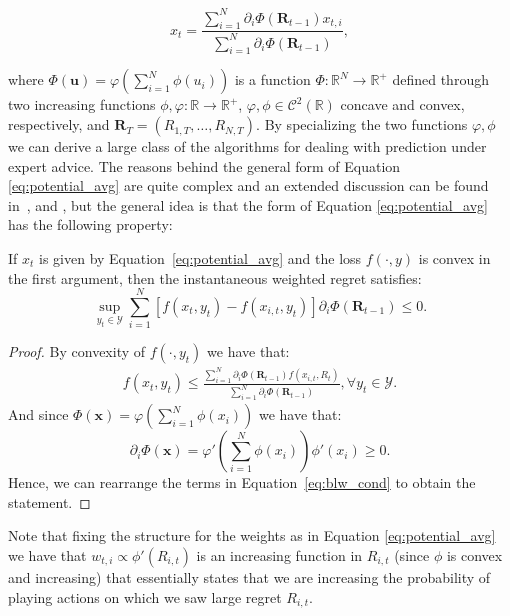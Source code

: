 \begin{equation}\label{eq:potential_avg}
x_t = \frac{\sum\limits_{i=1}^{N}\partial_i \Phi(\mathbf R_{t-1}) x_{t,i}}{\sum\limits_{i=1}^{N}\partial_i \Phi(\mathbf R_{t-1}) },
\end{equation}

where $\Phi(\mathbf u)=\varphi\left(\sum\limits_{i=1}^N\phi(u_i)\right)$ is a function $\Phi:\mathbb R^N\to\mathbb R^+$ defined through two increasing functions $\phi,\varphi:\mathbb R\to\mathbb R^+$, $\varphi,\phi\in\mathcal C^2(\mathbb R)$ concave and convex, respectively, and $\mathbf R_T=(R_{1,T},\ldots,R_{N,T})$.
By specializing the two functions $\varphi,\phi$ we can derive a large class of the algorithms for dealing with prediction under expert advice.
The reasons behind the general form of Equation \eqref{eq:potential_avg} are quite complex and an extended discussion can be found in~\cite{hart2001general}, \cite{cesa2003potential} and \cite{blackwell1956analog}, but the general idea is that the form of Equation \eqref{eq:potential_avg} has the following property:

\begin{theorem}\cite{cesa2003potential}
	If $x_t$ is given by Equation~\eqref{eq:potential_avg} and the loss $f(\cdot,y)$ is convex in the first argument, then the instantaneous weighted regret satisfies:  
	$$\sup\limits_{y_t\in\mathcal Y}\sum\limits_{i=1}^N[f(x_t,y_t)-f(x_{i,t},y_t)]\partial_i \Phi(\mathbf R_{t-1}) \le 0.$$
\end{theorem}

\begin{proof}
	By convexity of $f(\cdot,y_t)$ we have that:
\begin{align}\label{eq:blw_cond}
	f(x_t,y_t)\le\frac{\sum\limits_{i=1}^N\partial_i\Phi(\mathbf R_{t-1})f(x_{i,t},R_t)}{\sum\limits_{i=1}^N\partial_i\Phi(\mathbf R_{t-1})}, \forall y_t\in\mathcal Y.
\end{align}
And since $\Phi(\mathbf x)=\varphi\left(\sum\limits_{i=1}^N \phi(x_i)\right)$ we have that:
$$\partial_i\Phi(\mathbf x)=\varphi'\left(\sum\limits_{i=1}^N\phi(x_i)\right)\phi'(x_i)\ge0.$$
Hence, we can rearrange the terms in Equation~\eqref{eq:blw_cond} to obtain the statement.
\end{proof}

Note that fixing the structure for the weights as in Equation \eqref{eq:potential_avg} we have that $w_{t,i}\propto\phi'(R_{i,t})$ is an increasing function in $R_{i,t}$ (since $\phi$ is convex and increasing) that essentially states that we are increasing the probability of playing actions on which we saw large regret $R_{i,t}$.

